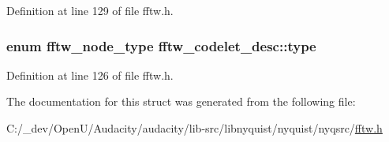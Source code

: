 Definition at line 129 of file fftw.\+h.

\subsubsection[{\texorpdfstring{type}{type}}]{\setlength{\rightskip}{0pt plus 5cm}enum {\bf fftw\+\_\+node\+\_\+type} fftw\+\_\+codelet\+\_\+desc\+::type}\hypertarget{structfftw__codelet__desc_a70eb46f55828f3b899272641c9d76949}{}\label{structfftw__codelet__desc_a70eb46f55828f3b899272641c9d76949}


Definition at line 126 of file fftw.\+h.



The documentation for this struct was generated from the following file\+:\begin{DoxyCompactItemize}
\item 
C\+:/\+\_\+dev/\+Open\+U/\+Audacity/audacity/lib-\/src/libnyquist/nyquist/nyqsrc/\hyperlink{fftw_8h}{fftw.\+h}\end{DoxyCompactItemize}
